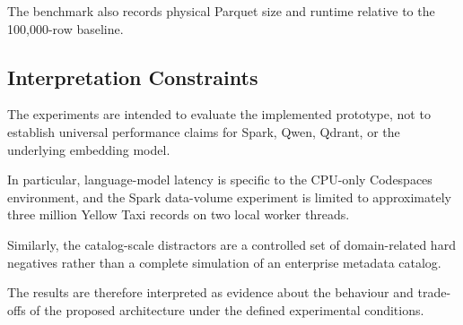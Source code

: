 The benchmark also records physical Parquet size and runtime relative to the
100,000-row baseline.


\subsection{Interpretation Constraints}

The experiments are intended to evaluate the implemented prototype, not to
establish universal performance claims for Spark, Qwen, Qdrant, or the
underlying embedding model.

In particular, language-model latency is specific to the CPU-only Codespaces
environment, and the Spark data-volume experiment is limited to approximately
three million Yellow Taxi records on two local worker threads.

Similarly, the catalog-scale distractors are a controlled set of
domain-related hard negatives rather than a complete simulation of an
enterprise metadata catalog.

The results are therefore interpreted as evidence about the behaviour and
trade-offs of the proposed architecture under the defined experimental
conditions.
